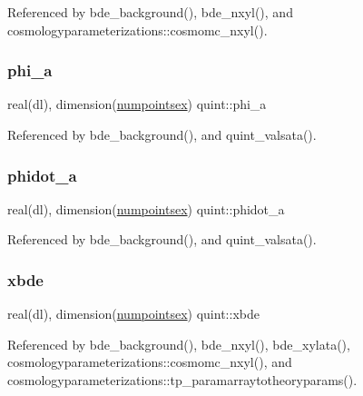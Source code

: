 Referenced by bde\+\_\+background(), bde\+\_\+nxyl(), and cosmologyparameterizations\+::cosmomc\+\_\+nxyl().

\mbox{\label{namespacequint_a061343360883da6eebfdb61cdfba449c}} 
\subsubsection{\texorpdfstring{phi\+\_\+a}{phi\_a}}
{\footnotesize\ttfamily real(dl), dimension(\mbox{\hyperlink{namespacequint_a8388814d2fb6e0f54431a7257a8f86a9}{numpointsex}}) quint\+::phi\+\_\+a}



Referenced by bde\+\_\+background(), and quint\+\_\+valsata().

\mbox{\label{namespacequint_a8719904f4c91dac880cb839088a69ca9}} 
\subsubsection{\texorpdfstring{phidot\+\_\+a}{phidot\_a}}
{\footnotesize\ttfamily real(dl), dimension(\mbox{\hyperlink{namespacequint_a8388814d2fb6e0f54431a7257a8f86a9}{numpointsex}}) quint\+::phidot\+\_\+a}



Referenced by bde\+\_\+background(), and quint\+\_\+valsata().

\mbox{\label{namespacequint_ac5553ef581fd33330e83b1849b3c90ff}} 
\subsubsection{\texorpdfstring{xbde}{xbde}}
{\footnotesize\ttfamily real(dl), dimension(\mbox{\hyperlink{namespacequint_a8388814d2fb6e0f54431a7257a8f86a9}{numpointsex}}) quint\+::xbde}



Referenced by bde\+\_\+background(), bde\+\_\+nxyl(), bde\+\_\+xylata(), cosmologyparameterizations\+::cosmomc\+\_\+nxyl(), and cosmologyparameterizations\+::tp\+\_\+paramarraytotheoryparams().

\mbox{\label{namespacequint_af164f7d3b20eb2e0ad7449519ada6734}} 
